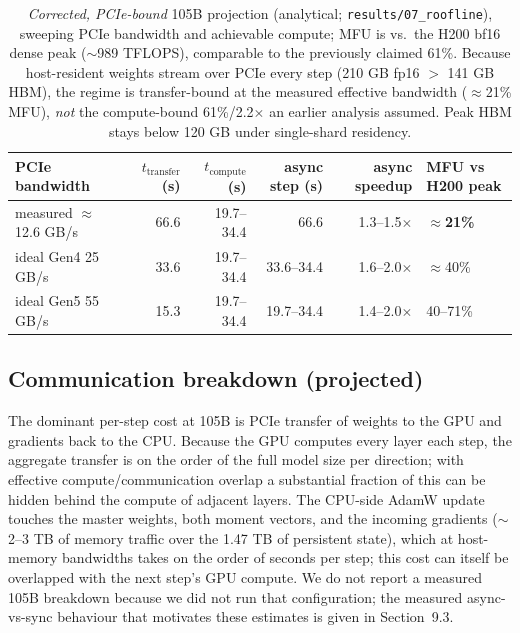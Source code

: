 \documentclass[11pt, letterpaper]{article}
\begin{document}
\begin{table}[h]
\centering
\begin{tabular}{lrrrrl}
\toprule
\textbf{PCIe bandwidth} & \textbf{$t_{\text{transfer}}$ (s)} & \textbf{$t_{\text{compute}}$ (s)} & \textbf{async step (s)} & \textbf{async speedup} & \textbf{MFU vs H200 peak} \\
\midrule
measured $\approx$12.6 GB/s & 66.6 & 19.7--34.4 & 66.6 & 1.3--1.5$\times$ & \textbf{$\approx$21\%} \\
ideal Gen4 25 GB/s & 33.6 & 19.7--34.4 & 33.6--34.4 & 1.6--2.0$\times$ & $\approx$40\% \\
ideal Gen5 55 GB/s & 15.3 & 19.7--34.4 & 19.7--34.4 & 1.4--2.0$\times$ & 40--71\% \\
\bottomrule
\end{tabular}
\caption{\emph{Corrected, PCIe-bound} 105B projection (analytical; \texttt{results/07\_roofline}), sweeping PCIe bandwidth and achievable compute; MFU is vs.\ the H200 bf16 dense peak ($\sim$989 TFLOPS), comparable to the previously claimed 61\%. Because host-resident weights stream over PCIe every step (210 GB fp16 $>$ 141 GB HBM), the regime is transfer-bound at the measured effective bandwidth ($\approx$21\% MFU), \emph{not} the compute-bound 61\%/2.2$\times$ an earlier analysis assumed. Peak HBM stays below 120 GB under single-shard residency.}
\label{tab:projection_105b}
\end{table}

\subsection{Communication breakdown (projected)}
The dominant per-step cost at 105B is PCIe transfer of weights to the GPU and gradients back to the CPU. Because the GPU computes every layer each step, the aggregate transfer is on the order of the full model size per direction; with effective compute/communication overlap a substantial fraction of this can be hidden behind the compute of adjacent layers. The CPU-side AdamW update touches the master weights, both moment vectors, and the incoming gradients ($\sim$2--3 TB of memory traffic over the 1.47 TB of persistent state), which at host-memory bandwidths takes on the order of seconds per step; this cost can itself be overlapped with the next step's GPU compute. We do not report a measured 105B breakdown because we did not run that configuration; the measured async-vs-sync behaviour that motivates these estimates is given in Section~9.3.
\end{document}
